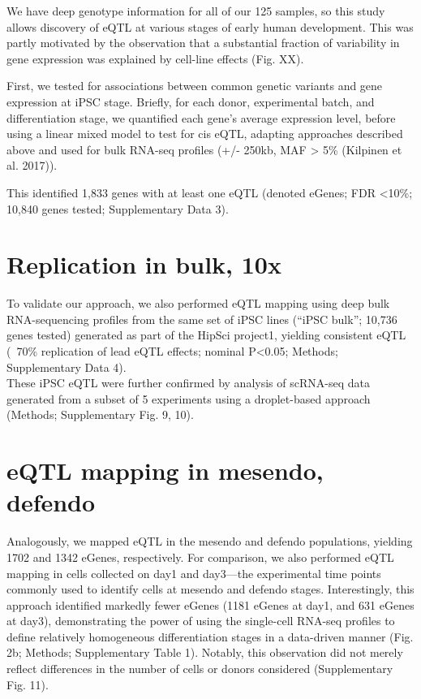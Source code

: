 We have deep genotype information for all of our 125 samples, so this study allows discovery of eQTL at various stages of early human development. 
This was partly motivated by the observation that a substantial fraction of variability in gene expression was explained by cell-line effects (Fig. XX).
 
First, we tested for associations between common genetic variants and gene expression at iPSC stage. 
Briefly, for each donor, experimental batch, and differentiation stage, we quantified each gene’s average expression level, before using a linear mixed model to test for cis eQTL, adapting approaches described above and used for bulk RNA-seq profiles (+/- 250kb, MAF > 5\% (Kilpinen et al. 2017)). 

This identified 1,833 genes with at least one eQTL (denoted eGenes; FDR <10\%; 10,840 genes tested; Supplementary Data 3). 

\section{Replication in bulk, 10x}

To validate our approach, we also performed eQTL mapping using deep bulk RNA-sequencing profiles from the same set of iPSC lines (“iPSC bulk”; 10,736 genes tested) generated as part of the HipSci project1, yielding consistent eQTL (~70\% replication of lead eQTL effects; nominal P<0.05; Methods; Supplementary Data 4).\\ 

These iPSC eQTL were further confirmed by analysis of scRNA-seq data generated from a subset of 5 experiments using a droplet-based approach (Methods; Supplementary Fig. 9, 10).

\section{eQTL mapping in mesendo, defendo}

Analogously, we mapped eQTL in the mesendo and defendo populations, yielding 1702 and 1342 eGenes, respectively. 
For comparison, we also performed eQTL mapping in cells collected on day1 and day3—the experimental time points commonly used to identify cells at mesendo and defendo stages.
Interestingly, this approach identified markedly fewer eGenes (1181 eGenes at day1, and 631 eGenes at day3), demonstrating the power of using the single-cell RNA-seq profiles to define relatively homogeneous differentiation stages in a data-driven manner (Fig. 2b; Methods; Supplementary Table 1). 
Notably, this observation did not merely reflect differences in the number of cells or donors considered (Supplementary Fig. 11).\\


